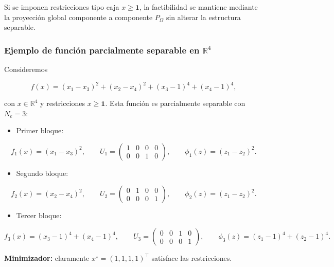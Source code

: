 \documentclass[
  spanish,
  us-letterpaper,
  DIV=11,
  numbers=noendperiod]{scrreprt}
\providecommand{\tightlist}{%
  \setlength{\itemsep}{0pt}\setlength{\parskip}{0pt}}
\numberwithin{equation}{section}
\begin{document}
Si se imponen restricciones tipo caja \(x\ge \mathbf{1}\), la
factibilidad se mantiene mediante la proyección global componente a
componente \(P_\Omega\) sin alterar la estructura separable.

\subsubsection{\texorpdfstring{Ejemplo de función parcialmente separable
en
\(\mathbb{R}^4\)}{Ejemplo de función parcialmente separable en \textbackslash mathbb\{R\}\^{}4}}\label{ejemplo-de-funciuxf3n-parcialmente-separable-en-mathbbr4}

Consideremos

\[
f(x) = (x_1 - x_3)^2 + (x_2 - x_4)^2 + (x_3 - 1)^4 + (x_4 - 1)^4,
\tag{3.144}
\]

con \(x\in\mathbb{R}^4\) y restricciones \(x\ge \mathbf{1}\). Esta
función es parcialmente separable con \(N_e=3\):

\begin{itemize}
\tightlist
\item
  Primer bloque:
\end{itemize}

\[
f_1(x)=(x_1-x_3)^2, \qquad
U_1=
\begin{pmatrix}
1 & 0 & 0 & 0 \\
0 & 0 & 1 & 0
\end{pmatrix}, \qquad
\phi_1(z)=(z_1-z_2)^2.
\]

\begin{itemize}
\tightlist
\item
  Segundo bloque:
\end{itemize}

\[
f_2(x)=(x_2-x_4)^2, \qquad
U_2=
\begin{pmatrix}
0 & 1 & 0 & 0 \\
0 & 0 & 0 & 1
\end{pmatrix}, \qquad
\phi_2(z)=(z_1-z_2)^2.
\]

\begin{itemize}
\tightlist
\item
  Tercer bloque:
\end{itemize}

\[
f_3(x)=(x_3-1)^4+(x_4-1)^4, \qquad
U_3=
\begin{pmatrix}
0 & 0 & 1 & 0 \\
0 & 0 & 0 & 1
\end{pmatrix}, \qquad
\phi_3(z)=(z_1-1)^4+(z_2-1)^4.
\]

\textbf{Minimizador:} claramente \(x^\star=(1,1,1,1)^\top\) satisface
las restricciones.
\end{document}
